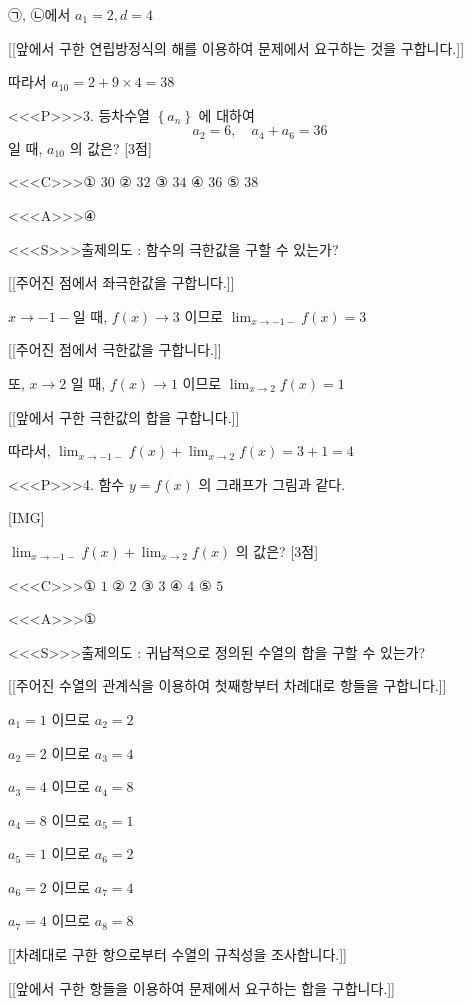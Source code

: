 \documentclass{oblivoir}
\begin{document}
㉠, ㉡에서
$a_{1}=2, d=4$

[[앞에서 구한 연립방정식의 해를 이용하여 문제에서 요구하는 것을 구합니다.]]

따라서
$a_{10}=2+9 \times 4=38$

<<<P>>>3. 등차수열 $\left\{a_{n}\right\}$ 에 대하여
$$
a_{2}=6, \quad a_{4}+a_{6}=36
$$
일 때, $a_{10}$ 의 값은? [3점]

<<<C>>>① $30$
② $32$
③ $34$
④ $36$
⑤ $38$

<<<A>>>④

<<<S>>>출제의도 : 함수의 극한값을 구할 수 있는가?

[[주어진 점에서 좌극한값을 구합니다.]]

$x \rightarrow-1-$일 때, $f(x) \rightarrow 3$ 이므로 $\displaystyle\lim _{x \rightarrow-1-} f(x)=3$

[[주어진 점에서 극한값을 구합니다.]]

또, $x \rightarrow 2$ 일 때, $f(x) \rightarrow 1$ 이므로 $\displaystyle\lim _{x \rightarrow 2} f(x)=1$

[[앞에서 구한 극한값의 합을 구합니다.]]

따라서,
$\displaystyle\lim _{x \rightarrow-1-} f(x)+\displaystyle\lim _{x \rightarrow 2} f(x)=3+1=4$

<<<P>>>4. 함수 $y=f(x)$ 의 그래프가 그림과 같다.

[IMG]

$\displaystyle\lim _{x \rightarrow-1-} f(x)+\displaystyle\lim _{x \rightarrow 2} f(x)$ 의 값은? [3점]

<<<C>>>① $1$
② $2$
③ $3$
④ $4$
⑤ $5$

<<<A>>>①

<<<S>>>출제의도 : 귀납적으로 정의된 수열의 합을 구할 수 있는가?


[[주어진 수열의 관계식을 이용하여 첫째항부터 차례대로 항들을 구합니다.]]

$a_{1}=1$ 이므로 $a_{2}=2$

$a_{2}=2$ 이므로 $a_{3}=4$

$a_{3}=4$ 이므로 $a_{4}=8$

$a_{4}=8$ 이므로 $a_{5}=1$

$a_{5}=1$ 이므로 $a_{6}=2$

$a_{6}=2$ 이므로 $a_{7}=4$

$a_{7}=4$ 이므로 $a_{8}=8$

[[차례대로 구한 항으로부터 수열의 규칙성을 조사합니다.]]

[[앞에서 구한 항들을 이용하여 문제에서 요구하는 합을 구합니다.]]
\end{document}
